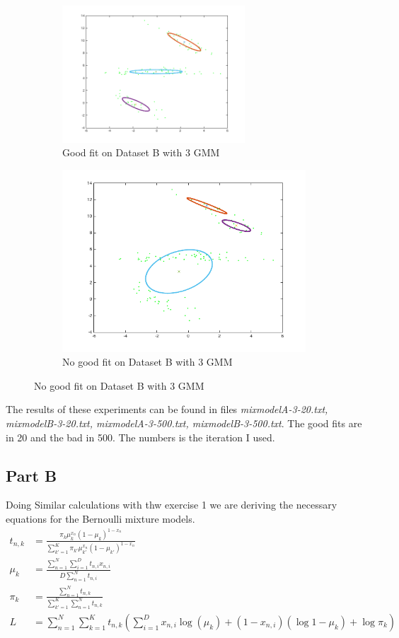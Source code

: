 \begin{figure}[ht]
\begin{subfigure}[b]{0.5\linewidth}
    \centering
    \includegraphics[width=0.75\textwidth]{figures/mixmodelB_3_20.png}
    \caption{Good fit on Dataset B with 3 GMM}
    \vspace{4ex}
 \end{subfigure}%
  \begin{subfigure}[b]{0.5\linewidth}
  \centering
\includegraphics[width=0.75\linewidth]{figures/mixmodelB_3_500.png}
\caption{No good fit on Dataset B with 3 GMM}
\vspace{4ex}
\end{subfigure}%
\end{figure}
The results of these experiments can be found in files \textit{mixmodelA-3-20.txt, mixmodelB-3-20.txt, mixmodelA-3-500.txt,
mixmodelB-3-500.txt}. The good fits are in 20 and the bad in 500. The numbers is the iteration I used.
%
\subsection*{Part B}
Doing Similar calculations with thw exercise 1 we are deriving the necessary
equations for the Bernoulli mixture models.
\begin{align*}
t_{n,k} &= \frac{\pi_{k}\mu_{k}^{x_{n}} (1-\mu_{k})^{1-x_{n}}}{\sum_{k'=1}^K \pi_{k'} \mu_{k'}^{x_{n}}(1-\mu_{k'})^{1-x_n}}\\
\mu_{k} &= \frac{\sum_{n=1}^N\sum_{i=1}^{D} t_{n,i}x_{n,i}}{D\sum_{n=1}^N t_{n,i}}\\
\pi_{k} &= \frac{\sum_{n=1}^{N}t_{n,k}}{\sum_{k'=1}^K\sum_{n=1}^{N}t_{n,k}}\\
L &= \sum_{n=1}^{N}\sum_{k=1}^{K}t_{n,k}(\sum_{i=1}^{D}x_{n,i}\log(\mu_{k})+(1-x_{n,i})(\log{1-\mu_{k}}) + \log\pi_{k})
\end{align*}
